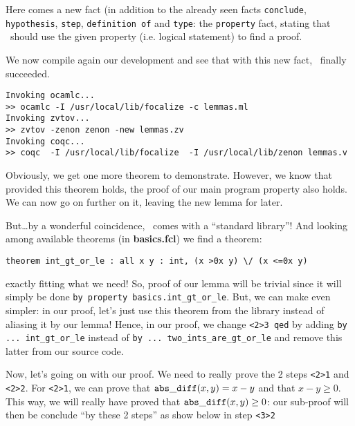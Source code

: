 \documentclass[11pt,a4paper,twoside,onecolumn,fullpage]{article}
\begin{document}
Here comes a new fact  (in addition to the
already seen facts \lstinline"conclude", \lstinline"hypothesis",
\lstinline"step", \lstinline"definition of" and \lstinline"type": the
\lstinline"property" fact, sta\-ting that \zenon\ should use the given
property (i.e. logical statement) to find a proof.

{\scriptsize
}

We now compile again our development and see that with this new fact,
\zenon\ finally succeeded.

{\scriptsize
\begin{verbatim}
Invoking ocamlc...
>> ocamlc -I /usr/local/lib/focalize -c lemmas.ml
Invoking zvtov...
>> zvtov -zenon zenon -new lemmas.zv
Invoking coqc...                                                
>> coqc  -I /usr/local/lib/focalize  -I /usr/local/lib/zenon lemmas.v
\end{verbatim}}

Obviously, we get one more theorem to demonstrate. However, we know
that provided this theorem holds, the proof of our main program
property also holds. We can now go on further on it, leaving the new
lemma for later.

But\ldots by a wonderful coincidence, \focal\ comes with a ``standard
library''! And looking among available theorems (in
\textbf{basics.fcl}) we find a theorem:

{\scriptsize
\begin{lstlisting}
theorem int_gt_or_le : all x y : int, (x >0x y) \/ (x <=0x y)
\end{lstlisting}}

\noindent exactly fitting what we need! So, proof of our lemma will be
trivial since it will simply be done \lstinline"by property basics.int_gt_or_le".
But, we can make even simpler: in our proof, let's just use this
theorem from the library instead of aliasing it by our lemma! Hence,
in our proof, we change \lstinline"<2>3 qed" by adding
\lstinline"by ... int_gt_or_le" instead of 
\lstinline"by ... two_ints_are_gt_or_le" and remove this latter from
our source code.

\medskip
Now, let's going on with our proof. We need to really prove the 2
steps \lstinline"<2>1" and \lstinline"<2>2". For \lstinline"<2>1", we
can prove that ${\tt abs\_diff} (x, y) = x - y$ and that
$x - y \ge 0$. This way, we will really have proved that
${\tt abs\_diff} (x, y) \ge 0$: our sub-proof will then be conclude ``by
these 2 steps'' as show below in step \lstinline"<3>2"
\end{document}
